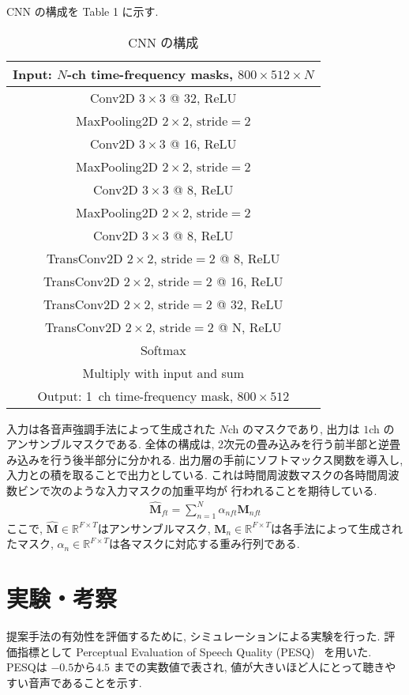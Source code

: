 \documentclass[a4j,10pt,uplatex]{jsarticle}
\begin{document}
CNN の構成を Table 1 に示す.
\begin{table}[tbp]
\centering
\caption{CNN の構成} %
\begin{tabular}{c}
\hline
Input: $N$-ch time-frequency masks, $800 \times 512 \times N$ \\
\hline \hline
Conv2D $3 \times 3$ @ 32, ReLU \\
MaxPooling2D $2 \times 2$, $\text{stride} = 2$ \\
\hline
Conv2D $3 \times 3$ @ 16, ReLU \\
MaxPooling2D $2 \times 2$, $\text{stride} = 2$ \\
\hline
Conv2D $3 \times 3$ @ 8, ReLU \\
MaxPooling2D $2 \times 2$, $\text{stride} = 2$ \\
\hline
Conv2D $3 \times 3$ @ 8, ReLU \\
\hline
TransConv2D $2 \times 2$, $\text{stride} = 2$ @ 8, ReLU \\
\hline
TransConv2D $2 \times 2$, $\text{stride} = 2$ @ 16, ReLU \\
\hline
TransConv2D $2 \times 2$, $\text{stride} = 2$ @ 32, ReLU \\
\hline
TransConv2D $2 \times 2$, $\text{stride} = 2$ @ N, ReLU \\
\hline
Softmax \\
\hline
Multiply with input and sum \\
\hline \hline
Output: \qty{1}{ch} time-frequency mask, $800 \times 512$ \\
\hline
\end{tabular}

\end{table}
入力は各音声強調手法によって生成された $N$ch のマスクであり, 出力は $1$ch のアンサンブルマスクである.
全体の構成は, 2次元の畳み込みを行う前半部と逆畳み込みを行う後半部分に分かれる.
出力層の手前にソフトマックス関数を導入し, 入力との積を取ることで出力としている.
これは時間周波数マスクの各時間周波数ビンで次のような入力マスクの加重平均が
行われることを期待している.
\begin{eqnarray}
    \bm{\hat{M}}_{ft} = \sum_{n=1}^{N} \alpha_{nft} \bm{M}_{nft}
\end{eqnarray}
ここで, $\bm{\hat{M}} \in \mathbb{R}^{F \times T}$はアンサンブルマスク, 
$\bm{M}_{n} \in \mathbb{R}^{F \times T}$は各手法によって生成されたマスク, 
$\alpha_{n} \in \mathbb{R}^{F \times T}$は各マスクに対応する重み行列である.

\section{実験・考察}
提案手法の有効性を評価するために, シミュレーションによる実験を行った.
評価指標として Perceptual Evaluation of Speech Quality (PESQ)~\cite{PESQ} を用いた.
PESQは $-0.5$から$4.5$ までの実数値で表され, 
値が大きいほど人にとって聴きやすい音声であることを示す.
\end{document}
